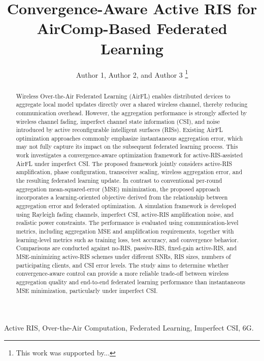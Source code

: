 \documentclass[lettersize,journal]{IEEEtran}
\begin{document}
\title{Convergence-Aware Active RIS for AirComp-Based Federated Learning}

\author{Author 1, Author 2, and Author 3 %
\thanks{This work was supported by...}%
}

\maketitle

\begin{abstract}
Wireless Over-the-Air Federated Learning (AirFL) enables distributed devices to aggregate local model updates directly over a shared wireless channel, thereby reducing communication overhead. However, the aggregation performance is strongly affected by wireless channel fading, imperfect channel state information (CSI), and noise introduced by active reconfigurable intelligent surfaces (RISs). Existing AirFL optimization approaches commonly emphasize instantaneous aggregation error, which may not fully capture its impact on the subsequent federated learning process. This work investigates a convergence-aware optimization framework for active-RIS-assisted AirFL under imperfect CSI. The proposed framework jointly considers active-RIS amplification, phase configuration, transceiver scaling, wireless aggregation error, and the resulting federated learning update. In contrast to conventional per-round aggregation mean-squared-error (MSE) minimization, the proposed approach incorporates a learning-oriented objective derived from the relationship between aggregation error and federated optimization. A simulation framework is developed using Rayleigh fading channels, imperfect CSI, active-RIS amplification noise, and realistic power constraints. The performance is evaluated using communication-level metrics, including aggregation MSE and amplification requirements, together with learning-level metrics such as training loss, test accuracy, and convergence behavior. Comparisons are conducted against no-RIS, passive-RIS, fixed-gain active-RIS, and MSE-minimizing active-RIS schemes under different SNRs, RIS sizes, numbers of participating clients, and CSI error levels. The study aims to determine whether convergence-aware control can provide a more reliable trade-off between wireless aggregation quality and end-to-end federated learning performance than instantaneous MSE minimization, particularly under imperfect CSI.
\end{abstract}

\begin{IEEEkeywords}
Active RIS, Over-the-Air Computation, Federated Learning, Imperfect CSI, 6G.
\end{IEEEkeywords}
\end{document}
